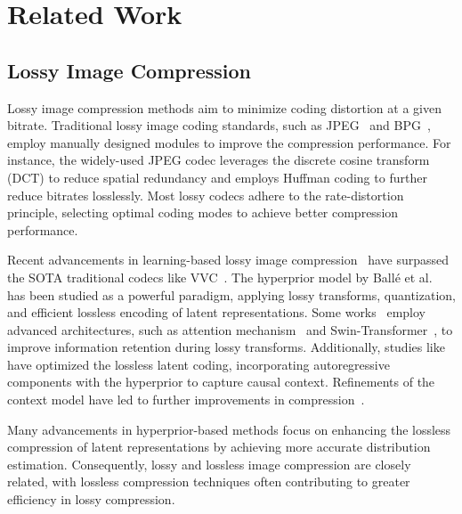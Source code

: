 \section{Related Work}

\subsection{Lossy Image Compression}
Lossy image compression methods aim to minimize coding distortion at a given bitrate. 
Traditional lossy image coding standards, such as JPEG~\cite{Wallace_1991_CACM_JPEG} and BPG~\cite{bpg}, employ manually designed modules to improve the compression performance. 
For instance, the widely-used JPEG codec leverages the discrete cosine transform (DCT) to reduce spatial redundancy and employs Huffman coding to further reduce bitrates losslessly. Most lossy codecs adhere to the rate-distortion principle, selecting optimal coding modes to achieve better compression performance.

Recent advancements in learning-based lossy image compression~\cite{Liu_2023_CVPR_LIC_TCM,Jiang_2023_ICMLW_MLIC++,Li_2024_ICLR_FLIC} have surpassed the SOTA traditional codecs like VVC~\cite{Bross_2021_TCSVT_VVC}. 
The hyperprior model by Ball{\'{e}} et al.~\cite{Balle_2018_ICLR_hyperprior} has been studied as a powerful paradigm, applying lossy transforms, quantization, and efficient lossless encoding of latent representations. Some works~\cite{Cheng_2020_CVPR_DGML,Zhu_2022_ICLR_SwinTCharm,Zou_2022_CVPR_winatten} employ advanced architectures, such as attention mechanism~\cite{Vaswani_2017_NIPS_attention} and Swin-Transformer~\cite{Liu_2021_ICCV_SwinT}, to improve information retention during lossy transforms. Additionally, studies like~\cite{Minnen_2018_NeurIPS_Joint} have optimized the lossless latent coding, incorporating autoregressive components with the hyperprior to capture causal context. Refinements of the context model have led to further improvements in compression~\cite{Minnen_2020_ICIP_Charm,He_2021_CVPR_Checkerboard,He_2022_CVPR_ELIC}.

Many advancements in hyperprior-based methods focus on enhancing the lossless compression of latent representations by achieving more accurate distribution estimation. Consequently, lossy and lossless image compression are closely related, with lossless compression techniques often contributing to greater efficiency in lossy compression.

